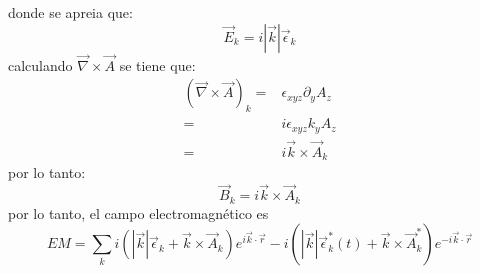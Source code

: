donde se apreia que:
\begin{equation*}
    \vec{E}_k = i|\vec{k}|\vec{\epsilon}_k
\end{equation*}
calculando $\vec{\nabla}\times \vec{A}$ se tiene que:
\begin{align*}
    \left(\vec{\nabla}\times\vec{A}\right)_k =&\epsilon_{xyz} \partial_y A_z\\
    =& i \epsilon_{xyz} k_y A_z \\
    =& i\vec{k}\times\vec{A}_k
\end{align*}
por lo tanto:
\begin{equation*}
    \vec{B}_k=i\vec{k}\times\vec{A}_k
\end{equation*}
por lo tanto, el campo electromagnético es
\begin{equation*}
    EM=\sum_k i\left(|\vec{k}|\vec{\epsilon}_k+\vec{k}\times\vec{A}_k\right) e^{i\vec{k}\cdot \vec{r}}-i\left(|\vec{k}|\vec{\epsilon}_k^*(t)+\vec{k}\times\vec{A}_k^*\right)e^{-i\vec{k}\cdot \vec{r}}
\end{equation*}